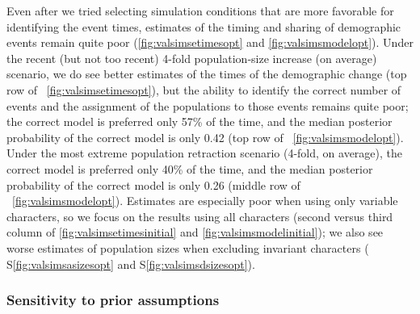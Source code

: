 Even after we tried selecting simulation conditions that are more favorable for
identifying the event times, estimates of the timing and
sharing of demographic events remain quite poor
(\figs \ref{fig:valsimsetimesopt} and \ref{fig:valsimsmodelopt}).
Under the recent (but not too recent) 4-fold population-size increase (on
average) scenario, we do see better estimates of the times of the demographic
change
(top row of \fig{}~\ref{fig:valsimsetimesopt}),
but the ability to identify the correct number of events and the assignment of
the populations to those events remains quite poor;
the correct model is preferred only 57\% of the time, and the
median posterior probability of the correct model is only 0.42
(top row of \fig{}~\ref{fig:valsimsmodelopt}).
Under the most extreme population retraction scenario (4-fold, on average),
the correct model is preferred only 40\% of the time, and the median
posterior probability of the correct model is only 0.26
(middle row of \fig{}~\ref{fig:valsimsmodelopt}).
Estimates are especially poor when using only variable characters,
so we focus on the results using all characters
(second versus third column of \figs
\ref{fig:valsimsetimesinitial}
and
\ref{fig:valsimsmodelinitial});
we also see worse estimates of population sizes when excluding invariant
characters
(\figs
S\ref{fig:valsimsasizesopt}
and
S\ref{fig:valsimsdsizesopt}).

\ifembed{

}{}

\ifembed{

}{}


\subsubsection{Sensitivity to prior assumptions}

